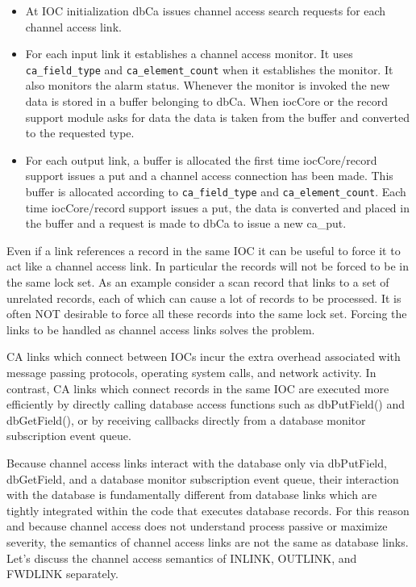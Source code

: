 \begin{itemize}\item At IOC initialization dbCa issues channel access search requests for each channel access link.

\item For each input link it establishes a channel access monitor. It uses \verb|ca_field_type| and \verb|ca_element_count| 
when it establishes the monitor. It also monitors the alarm status. Whenever the monitor is invoked the new data is 
stored in a buffer belonging to dbCa. When iocCore or the record support module asks for data the data is taken 
from the buffer and converted to the requested type.

\item For each output link, a buffer is allocated the first time iocCore/record support issues a put and a channel access 
connection has been made. This buffer is allocated according to  \verb|ca_field_type| and \verb|ca_element_count|. 
Each time iocCore/record support issues a put, the data is converted and placed in the buffer and a request is made 
to dbCa to issue a new ca\_put.

\end{itemize}Even if a link references a record in the same IOC it can be useful to force it to act like a channel access link. In particular 
the records will not be forced to be in the same lock set. As an example consider a scan record that links to a set of 
unrelated records, each of which can cause a lot of records to be processed. It is often NOT desirable to force all these 
records into the same lock set. Forcing the links to be handled as channel access links solves the problem.

CA links which connect between IOCs incur the extra overhead associated with message passing protocols, operating 
system calls, and network activity. In contrast, CA links which connect records in the same IOC are executed more 
efficiently by directly calling database access functions such as dbPutField() and dbGetField(), or by receiving callbacks 
directly from a database monitor subscription event queue.

Because channel access links interact with the database only via dbPutField, dbGetField, and a database monitor 
subscription event queue, their interaction with the database is fundamentally different from database links which are 
tightly integrated within the code that executes database records. For this reason and because channel access does not 
understand process passive or maximize severity, the semantics of channel access links are not the same as database links. 
Let's discuss the channel access semantics of INLINK, OUTLINK, and FWDLINK separately.

